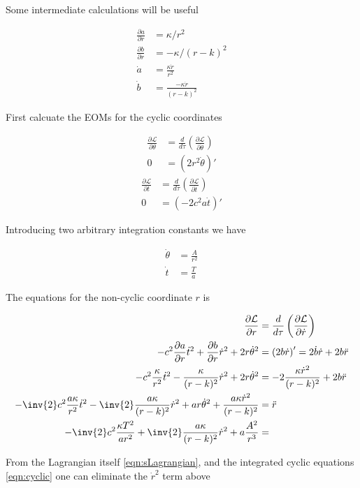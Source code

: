 \documentclass{article}      %
\newcommand{\LL}[0]{\mathcal{L}}
\newcommand{\PD}[2]{\frac{\partial {#2}}{\partial {#1}}}
\newcommand{\dottheta}[0]{\dot{\theta}}
\newcommand{\adot}[0]{\dot{a}}
\newcommand{\bdot}[0]{\dot{b}}
\newcommand{\tdot}[0]{\dot{t}}
\newcommand{\rdot}[0]{\dot{r}}
\newcommand{\rddot}[0]{\ddot{r}}
\begin{document}
Some intermediate calculations will be useful

\begin{align*}
\PD{r}{a} &= \kappa/r^2 \\
\PD{r}{b} &= -\kappa/(r-k)^2 \\
\adot &= \frac{\kappa \rdot}{r^2} \\
\bdot &= \frac{-\kappa \rdot}{(r-k)^2}
\end{align*}

First calcuate the EOMs for the cyclic coordinates

\begin{align*}
\PD{\theta}{\LL} &= \frac{d}{d\tau}\left(\PD{\dottheta}{\LL}\right) \\
0 &= (2 r^2 \dottheta)'
\end{align*}
\begin{align*}
\PD{t}{\LL} &= \frac{d}{d\tau}\left(\PD{\tdot}{\LL}\right) \\
0 &= (- 2 c^2 a \tdot)'
\end{align*}

Introducing two arbitrary integration constants we have

\begin{align}\label{eqn:cyclic}
\dottheta &= \frac{A}{r^2} \\
\tdot &= \frac{ T }{a} 
\end{align}

The equations for the non-cyclic coordinate $r$ is

\begin{align*}
\PD{r}{\LL} &= \frac{d}{d\tau}\left(\PD{\rdot}{\LL}\right) \\
-c^2 \PD{r}{a} \tdot^2 + \PD{r}{b} \rdot^2 + 2 r \dottheta^2 &= \left( 2 b \rdot \right)' = 2 \bdot \rdot + 2 b \rddot \\
-c^2 \frac{\kappa}{r^2} \tdot^2 - \frac{\kappa}{(r-k)^2} \rdot^2 + 2 r \dottheta^2 &= -2 \frac{\kappa \rdot^2}{(r-k)^2} + 2 b \rddot \\
-\inv{2} c^2 \frac{a \kappa}{r^2} \tdot^2 - \inv{2} \frac{a \kappa}{(r-k)^2} \rdot^2 + a r \dottheta^2 +\frac{a \kappa \rdot^2}{(r-k)^2} &= \rddot \\
-\inv{2} c^2 \frac{\kappa T^2}{a r^2} + \inv{2} \frac{a \kappa}{(r-k)^2} \rdot^2 + a \frac{A^2}{r^3} &= \\
\end{align*}

From the Lagrangian itself \ref{eqn:sLagrangian}, and the
integrated cyclic equations \ref{eqn:cyclic} one can eliminate
the $\rdot^2$ term above
\end{document}
